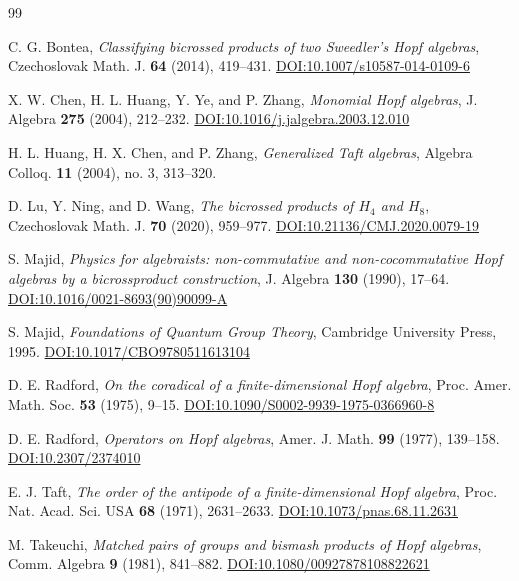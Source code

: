 \documentclass[twoside,11pt]{amsart}
\begin{document}
\begin{thebibliography}{99}
		
		C. G. Bontea,
		\emph{Classifying bicrossed products of two Sweedler's Hopf algebras},
		Czechoslovak Math. J. \textbf{64} (2014), 419--431.
		\href{https://doi.org/10.1007/s10587-014-0109-6}{DOI:10.1007/s10587-014-0109-6}
		
		X. W. Chen, H. L. Huang, Y. Ye, and P. Zhang,
		\emph{Monomial Hopf algebras},
		J. Algebra \textbf{275} (2004), 212--232.
		\href{https://doi.org/10.1016/j.jalgebra.2003.12.010}{DOI:10.1016/j.jalgebra.2003.12.010}
		
		H. L. Huang, H. X. Chen, and P. Zhang,
		\emph{Generalized Taft algebras},
		Algebra Colloq. \textbf{11} (2004), no. 3, 313--320.
		
		D. Lu, Y. Ning, and D. Wang,
		\emph{The bicrossed products of $H_4$ and $H_8$},
		Czechoslovak Math. J. \textbf{70} (2020), 959--977.
		\href{https://doi.org/10.21136/CMJ.2020.0079-19}{DOI:10.21136/CMJ.2020.0079-19}
		
		S. Majid,
		\emph{Physics for algebraists: non-commutative and non-cocommutative Hopf
			algebras by a bicrossproduct construction},
		J. Algebra \textbf{130} (1990), 17--64.
		\href{https://doi.org/10.1016/0021-8693(90)90099-A}{DOI:10.1016/0021-8693(90)90099-A}
		
		S. Majid,
		\emph{Foundations of Quantum Group Theory},
		Cambridge University Press, 1995.
		\href{https://doi.org/10.1017/CBO9780511613104}{DOI:10.1017/CBO9780511613104}
		
		D. E. Radford,
		\emph{On the coradical of a finite-dimensional Hopf algebra},
		Proc. Amer. Math. Soc. \textbf{53} (1975), 9--15.
		\href{https://doi.org/10.1090/S0002-9939-1975-0366960-8}{DOI:10.1090/S0002-9939-1975-0366960-8}
		
		D. E. Radford,
		\emph{Operators on Hopf algebras},
		Amer. J. Math. \textbf{99} (1977), 139--158.
		\href{https://doi.org/10.2307/2374010}{DOI:10.2307/2374010}
		
		E. J. Taft,
		\emph{The order of the antipode of a finite-dimensional Hopf algebra},
		Proc. Nat. Acad. Sci. USA \textbf{68} (1971), 2631--2633.
		\href{https://doi.org/10.1073/pnas.68.11.2631}{DOI:10.1073/pnas.68.11.2631}
		
		M. Takeuchi,
		\emph{Matched pairs of groups and bismash products of Hopf algebras},
		Comm. Algebra \textbf{9} (1981), 841--882.
		\href{https://doi.org/10.1080/00927878108822621}{DOI:10.1080/00927878108822621}
		

\end{thebibliography}
\end{document}
